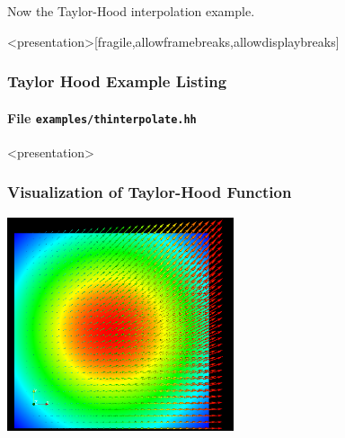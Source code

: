 Now the Taylor-Hood interpolation example.

\begin{frame}<presentation>[fragile,allowframebreaks,allowdisplaybreaks]
\frametitle<presentation>{Taylor Hood Example Listing}
\framesubtitle<presentation>{File \texttt{examples/thinterpolate.hh}}

\end{frame}

\begin{frame}<presentation>
\frametitle<presentation>{Visualization of Taylor-Hood Function}
\begin{center}
\includegraphics[width=0.5\textwidth]{./EPS/thinterpolate}
\end{center}
\end{frame}


